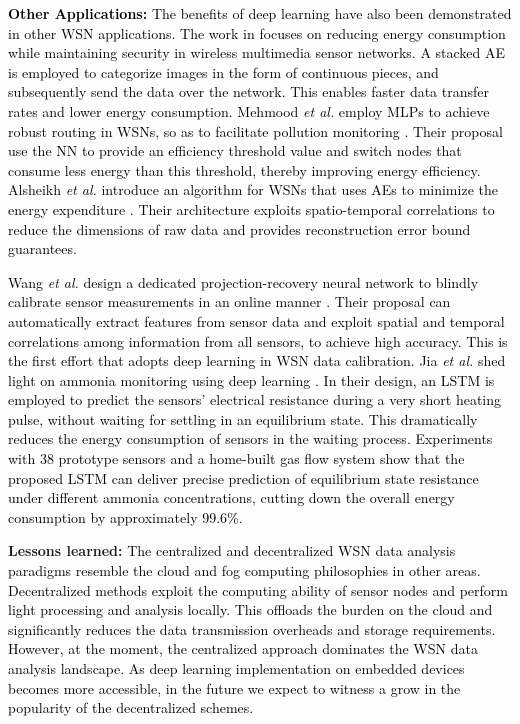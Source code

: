 \documentclass[journal,comsoc,letter]{IEEEtran}
\newcommand{\rev}[1]{\textcolor{black}{#1}}
\begin{document}
\rev{\noindent \textbf{Other Applications:}} \rev{The benefits of deep learning have also been demonstrated in other WSN applications. The work in \cite{heydari2017reduce} focuses on reducing energy consumption while maintaining security in wireless multimedia sensor networks. A stacked AE is employed to categorize images in the form of continuous pieces, and subsequently send the data over the network. This enables faster data transfer rates and lower energy consumption. Mehmood \emph{et al.} employ MLPs to achieve robust routing in WSNs, so as to facilitate  pollution monitoring \cite{mehmood2017eldc}. Their proposal use the NN to provide an efficiency threshold value and switch nodes that consume less energy than this threshold, thereby improving energy efficiency. Alsheikh \emph{et al.} introduce an algorithm for WSNs that uses AEs to minimize the energy expenditure \cite{alsheikh2016rate}. Their architecture exploits spatio-temporal correlations to reduce the dimensions of raw data and provides reconstruction error bound guarantees.}

\rev{Wang \emph{et al.} design a dedicated projection-recovery neural network to blindly calibrate sensor measurements in an online manner \cite{wang2017deep3}. Their proposal can automatically extract features from sensor data and exploit spatial and temporal correlations among information from all sensors, to achieve high accuracy. This is the first effort that adopts deep learning in WSN data calibration. Jia \emph{et al.} shed light on ammonia monitoring using deep learning \cite{jia2018continuous}. In their design, an LSTM is employed to predict the sensors' electrical resistance during a very short heating pulse, without waiting for settling in an equilibrium state. This dramatically reduces the energy consumption of sensors in the waiting process. Experiments with 38 prototype sensors and a home-built gas flow system show that the proposed LSTM can deliver precise prediction of equilibrium state resistance under different ammonia concentrations, cutting down the overall energy consumption by approximately 99.6\%.}



\textbf{Lessons learned:} \rev{The centralized and decentralized WSN data analysis paradigms resemble the cloud and fog computing philosophies in other areas. Decentralized methods exploit the computing ability of sensor nodes and perform light processing and analysis locally. This offloads the burden on the cloud and significantly reduces the data transmission overheads and storage requirements. However, at the moment, the centralized approach dominates the WSN data analysis landscape. As deep learning implementation on embedded devices becomes more accessible, in the future we expect to witness a grow in the popularity of the decentralized schemes.}
\end{document}
